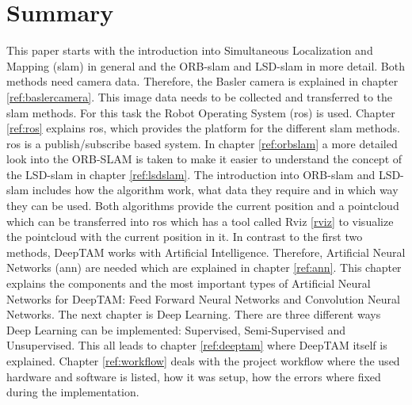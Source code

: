 

\chapter*{Summary}

This paper starts with the introduction into Simultaneous Localization and Mapping (\gls{slam}) in general and the ORB-\gls{slam} and LSD-\gls{slam} in more detail. \newline
Both methods need camera data. Therefore, the Basler camera is explained in chapter \ref{ref:baslercamera}. This image data needs to be collected and transferred to the \gls{slam} methods. For this task the Robot Operating System (\gls{ros}) is used. Chapter \ref{ref:ros} explains \gls{ros}, which provides the platform for the different \gls{slam} methods. \gls{ros} is a publish/subscribe based system. In chapter \ref{ref:orbslam} a more detailed look into the ORB-SLAM is taken to make it easier to understand the concept of the LSD-\gls{slam} in chapter \ref{ref:lsdslam}. The introduction into ORB-\gls{slam} and LSD-\gls{slam} includes how the algorithm work, what data they require and in which way they can be used. Both algorithms provide the current position and a pointcloud which can be transferred into \gls{ros} which has a tool called Rviz \ref{rviz} to visualize the pointcloud with the current position in it. \newline
In contrast to the first two methods, DeepTAM works with Artificial Intelligence. Therefore, Artificial Neural Networks (\gls{ann}) are needed which are explained in chapter \ref{ref:ann}. This chapter explains the components and the most important types of Artificial Neural Networks for DeepTAM: Feed Forward Neural Networks and Convolution Neural Networks. The next chapter is Deep Learning. There are three different ways Deep Learning can be implemented: Supervised, Semi-Supervised and Unsupervised. This all leads to chapter \ref{ref:deeptam} where DeepTAM itself is explained. \newline
Chapter \ref{ref:workflow} deals with the project workflow where the used hardware and software is listed, how it was setup, how the errors where fixed during the implementation.
